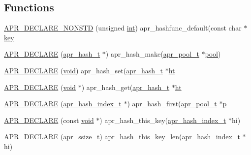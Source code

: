 \subsection*{Functions}
\begin{DoxyCompactItemize}
\item 
\hyperlink{group__apr__hash_ga54cef51a6f6906d5fc581b15e0f211aa}{A\+P\+R\+\_\+\+D\+E\+C\+L\+A\+R\+E\+\_\+\+N\+O\+N\+S\+TD} (unsigned \hyperlink{pcre_8txt_a42dfa4ff673c82d8efe7144098fbc198}{int}) apr\+\_\+hashfunc\+\_\+default(const char $\ast$\hyperlink{apr__siphash_8h_adac0b6a30345ea1d0daa8a692b0b7ad9}{key}
\item 
\hyperlink{group__apr__hash_ga090f75283396043d20ff43f05df27e2d}{A\+P\+R\+\_\+\+D\+E\+C\+L\+A\+RE} (\hyperlink{structapr__hash__t}{apr\+\_\+hash\+\_\+t} $\ast$) apr\+\_\+hash\+\_\+make(\hyperlink{structapr__pool__t}{apr\+\_\+pool\+\_\+t} $\ast$\hyperlink{group__APR__XLATE_gabb3cd978f04c73d0b763c391e9bfde73}{pool})
\item 
\hyperlink{group__apr__hash_ga834b9359df0f05d4011048e3ddba5d4a}{A\+P\+R\+\_\+\+D\+E\+C\+L\+A\+RE} (\hyperlink{group__MOD__ISAPI_gacd6cdbf73df3d9eed42fa493d9b621a6}{void}) apr\+\_\+hash\+\_\+set(\hyperlink{structapr__hash__t}{apr\+\_\+hash\+\_\+t} $\ast$\hyperlink{group__apr__hash_ga18cf3e4c61221aa79a41989befa7839f}{ht}
\item 
\hyperlink{group__apr__hash_gaf755daf8d4cbb73710384a0a0f54b974}{A\+P\+R\+\_\+\+D\+E\+C\+L\+A\+RE} (\hyperlink{group__MOD__ISAPI_gacd6cdbf73df3d9eed42fa493d9b621a6}{void} $\ast$) apr\+\_\+hash\+\_\+get(\hyperlink{structapr__hash__t}{apr\+\_\+hash\+\_\+t} $\ast$\hyperlink{group__apr__hash_ga18cf3e4c61221aa79a41989befa7839f}{ht}
\item 
\hyperlink{group__apr__hash_ga7b2be5093c956710fa54f0338e0f2b01}{A\+P\+R\+\_\+\+D\+E\+C\+L\+A\+RE} (\hyperlink{structapr__hash__index__t}{apr\+\_\+hash\+\_\+index\+\_\+t} $\ast$) apr\+\_\+hash\+\_\+first(\hyperlink{structapr__pool__t}{apr\+\_\+pool\+\_\+t} $\ast$\hyperlink{group__APACHE__CORE__MPM_ga5cd91701e5c167f2b1a38e70ab57817e}{p}
\item 
\hyperlink{group__apr__hash_ga885401e3c95ab27f7dfb609fbd44e30b}{A\+P\+R\+\_\+\+D\+E\+C\+L\+A\+RE} (const \hyperlink{group__MOD__ISAPI_gacd6cdbf73df3d9eed42fa493d9b621a6}{void} $\ast$) apr\+\_\+hash\+\_\+this\+\_\+key(\hyperlink{structapr__hash__index__t}{apr\+\_\+hash\+\_\+index\+\_\+t} $\ast$hi)
\item 
\hyperlink{group__apr__hash_ga9f362e61091d1390b52e9340f3f1749d}{A\+P\+R\+\_\+\+D\+E\+C\+L\+A\+RE} (\hyperlink{group__apr__platform_ga215ebb88932bee220b766263ebbfe6fa}{apr\+\_\+ssize\+\_\+t}) apr\+\_\+hash\+\_\+this\+\_\+key\+\_\+len(\hyperlink{structapr__hash__index__t}{apr\+\_\+hash\+\_\+index\+\_\+t} $\ast$hi)

\end{DoxyCompactItemize}
